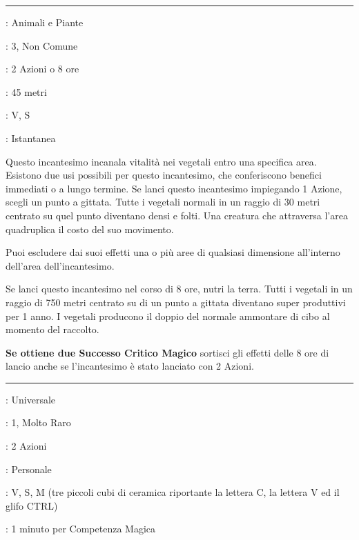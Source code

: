\begin{multicols}{2}
\smallskip\noindent\rule{\linewidth}{2pt} \hypertarget{Crescita Vegetale}{}\medskip{}
\noindent
\begin{description}[noitemsep, topsep=0pt, parsep=0pt, partopsep=0pt, leftmargin=0cm, labelwidth=2.8cm]
	\item[\textbf{Lista di Magia}]: Animali e Piante
	\item[\textbf{Livello}]: 3, Non Comune
	\item[\textbf{T. di Lancio}]: 2 Azioni o 8 ore
	\item[\textbf{Gittata}]: 45 metri
	\item[\textbf{Componenti}]: V, S
	\item[\textbf{Durata}]: Istantanea
\end{description}

Questo incantesimo incanala vitalità nei vegetali entro una specifica area. Esistono due usi possibili per questo incantesimo, che conferiscono benefici immediati o a lungo termine. Se lanci questo incantesimo impiegando 1 Azione, scegli un punto a gittata. Tutte i vegetali normali in un raggio di 30 metri centrato su quel punto diventano densi e folti. Una creatura che attraversa l'area quadruplica il costo del suo movimento.

Puoi escludere dai suoi effetti una o più aree di qualsiasi dimensione all'interno dell'area dell'incantesimo.

Se lanci questo incantesimo nel corso di 8 ore, nutri la terra. Tutti i vegetali in un raggio di 750 metri centrato su di un punto a gittata diventano super produttivi per 1 anno. I vegetali producono il doppio del normale ammontare di cibo al momento del raccolto.

\textbf{Se ottiene due Successo Critico Magico} sortisci gli effetti delle 8 ore di lancio anche se l'incantesimo è stato lanciato con 2 Azioni.

\smallskip\noindent\rule{\linewidth}{2pt} \hypertarget{CTRLC+CTRLV}{}\medskip{}
\noindent
\begin{description}[noitemsep, topsep=0pt, parsep=0pt, partopsep=0pt, leftmargin=0cm, labelwidth=2.8cm]
	\item[\textbf{Lista di Magia}]: Universale
	\item[\textbf{Livello}]: 1, Molto Raro
	\item[\textbf{T. di Lancio}]: 2 Azioni
	\item[\textbf{Gittata}]: Personale
	\item[\textbf{Componenti}]: V, S, M (tre piccoli cubi di ceramica riportante la lettera C, la lettera V ed il glifo CTRL)
	\item[\textbf{Durata}]: 1 minuto per Competenza Magica
\end{description}


\end{multicols}
